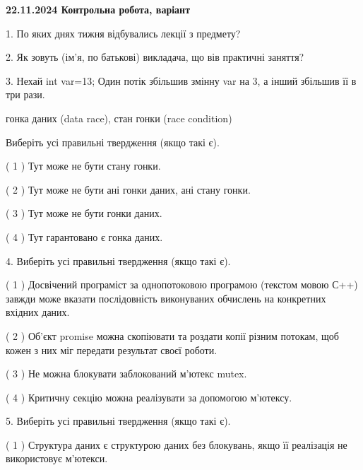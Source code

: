 \documentclass[12pt, ukrainian]{article}
\begin{document}
\vspace{4mm}
\newpage
\begin {large}

\textbf{22.11.2024 Контрольна робота, варіант  }\par


{
1. По яких днях тижня відбувались лекції з предмету?



\vspace{5mm}
2. Як зовуть (ім'я, по батькові) викладача, що вів практичні заняття?



\vspace{5mm}
3. Нехай int var=13; Один потік збільшив змінну var на 3, а інший збільшив її в три рази.

гонка даних (data race), стан гонки (race condition)

Виберіть усі правильні твердження (якщо такі є).\par
\vspace{2mm}
( 1 ) Тут може не бути стану гонки.%

( 2 ) Тут може не бути ані гонки даних, ані стану гонки.%

( 3 ) Тут може не бути гонки даних.%

( 4 ) Тут гарантовано є гонка даних.%


\vspace{5mm}
4. Виберіть усі правильні твердження (якщо такі є).\par
\vspace{2mm}

( 1 ) Досвічений програміст за однопотоковою програмою (текстом мовою С++) завжди може вказати послідовність виконуваних обчислень на конкретних вхідних даних.%

( 2 ) Об’єкт promise можна скопіювати та роздати копії різним потокам, щоб кожен з них міг передати результат своєї роботи.%

( 3 ) Не можна блокувати заблокований м’ютекс mutex.%

( 4 ) Критичну секцію можна реалізувати за допомогою м’ютексу.%


\vspace{5mm}
5. Виберіть усі правильні твердження (якщо такі є).\par
\vspace{2mm}

( 1 ) Структура даних є структурою даних без блокувань, якщо її реалізація не використовує м’ютекси.%

}
\end{large}
\end{document}

